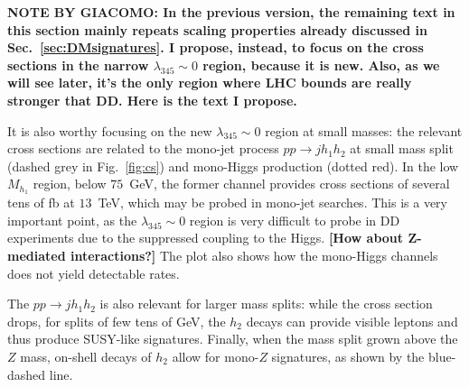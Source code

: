 \documentclass[12pt,a4paper]{article}
\newcommand {\red} {\color{red}}
\begin{document}
{\red \bf NOTE BY GIACOMO: In the previous version, the remaining text in this section mainly repeats scaling properties already discussed in Sec.~\ref{sec:DMsignatures}. I propose, instead, to focus on the cross sections in the narrow $\lambda_{345}\sim 0$ region, because it is new. Also, as we will see later, it's the only region where LHC bounds are really stronger that DD. Here is the text I propose.}

It is also worthy focusing on the new $\lambda_{345}\sim 0$ region at small masses: the relevant cross sections are related to the mono-jet process $p p \to j h_1 h_2$ at small mass split (dashed grey in Fig.~\ref{fig:cs}) and mono-Higgs production (dotted red).
In the low $M_{h_1}$ region, below $75$~GeV, the former channel provides cross sections of several tens of fb at $13$~TeV, which may be probed in mono-jet searches. This is a very important point, as the $\lambda_{345}\sim 0$ region is very difficult to probe in DD experiments due to the suppressed coupling to the Higgs. {\red \bf [How about Z-mediated interactions?]}
The plot also shows how the mono-Higgs channels does not yield detectable rates.

The $p p \to j h_1 h_2$ is also relevant for larger mass splits: while the cross section drops, for splits of few tens of GeV, the $h_2$ decays can provide visible leptons and thus produce SUSY-like signatures. Finally, when the mass split grown above the $Z$ mass, on-shell decays of $h_2$ allow for mono-$Z$ signatures, as shown by the blue-dashed line.
\end{document}
